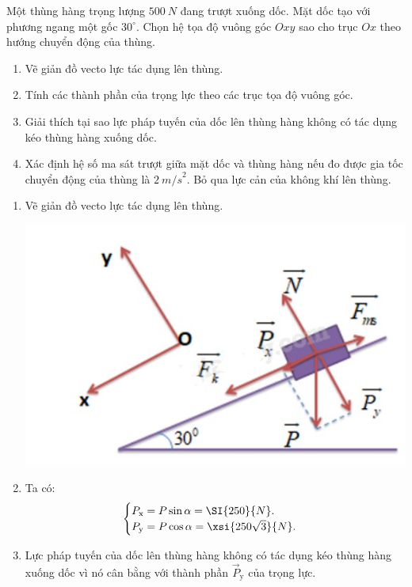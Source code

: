 \begin{enumerate}[label=\bfseries Bài \arabic*:]
{
	Một thùng hàng trọng lượng $\SI{500}{N}$ đang trượt xuống dốc. Mặt dốc tạo với phương ngang một gốc $30^\circ$. Chọn hệ tọa độ vuông góc $Oxy$ sao cho trục $Ox$ theo hướng chuyển động của thùng.
	\begin{enumerate}[label=\alph*)]
		\item  Vẽ giản đồ vecto lực tác dụng lên thùng.
		\item Tính các thành phần của trọng lực theo các trục tọa độ vuông góc.
		\item Giải thích tại sao lực pháp tuyến của dốc lên thùng hàng không có tác dụng kéo thùng hàng xuống dốc.
		\item Xác định hệ số ma sát trượt giữa mặt dốc và thùng hàng nếu đo được gia tốc chuyển động của thùng là $\SI{2}{m/s}^2$. Bỏ qua lực cản của không khí lên thùng.
	\end{enumerate}
}

\hideall
{
	
	\begin{enumerate}[label=\alph*)]
		\item  Vẽ giản đồ vecto lực tác dụng lên thùng.
		
		
		\begin{center}
			\includegraphics[scale=0.5]{../figs/VN10-2022-PH-TP021-14.jpg}
		\end{center}
		
		\item 
		Ta có:
		$$\begin{cases}
			P_\text{x}= P\sin \alpha = \SI{250}{N}.   \\
			P_\text{y}= P \cos \alpha = \xsi{250\sqrt 3}{N}.
		\end{cases}$$
		
		\item Lực pháp tuyến của dốc lên thùng hàng không có tác dụng kéo thùng hàng xuống dốc vì nó cân bằng với thành phần $\vec P_\text{y}$
		của trọng lực.
		

\end{enumerate}}
\end{enumerate}
